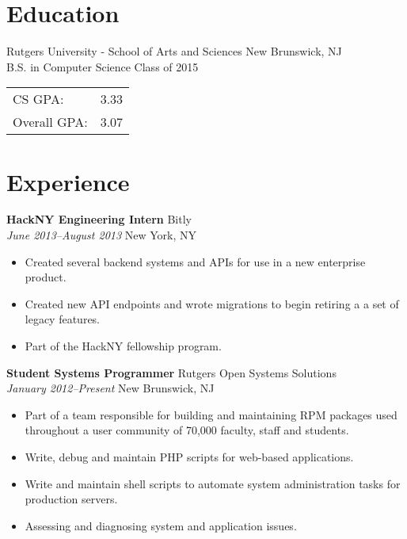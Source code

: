 \documentclass[centered,overlapped]{res}
\begin{document}

\address{153 Riveredge Road \\ Tinton Falls, NJ 07724}
\address{josh@jmatthews.us \\ github.com/jmatth}

\begin{resume}


\section{Education}

Rutgers University - School of Arts and Sciences \hfill New Brunswick, NJ\\
B.S. in Computer Science \hfill Class of 2015 \\
\begin{tabular}{l l}
	CS GPA: & 3.33 \\
	Overall GPA: & 3.07 \\
\end{tabular}

\section{Experience}

{\bf HackNY Engineering Intern} \hfill Bitly\\
\textit{June 2013--August 2013} \hfill New York, NY
\begin{itemize} \itemsep -2pt %
	\item Created several backend systems and APIs for use in a new enterprise
        product.
    \item Created new API endpoints and wrote migrations to begin retiring a
        a set of legacy features.
    \item Part of the HackNY fellowship program.
\end{itemize}

{\bf Student Systems Programmer} \hfill Rutgers Open Systems Solutions\\
\textit{January 2012--Present} \hfill New Brunswick, NJ
\begin{itemize} \itemsep -2pt %
	\item Part of a team responsible for building and maintaining RPM packages used throughout a user community of 70,000 faculty, staff and students.
	\item Write, debug and maintain PHP scripts for web-based applications.
	\item Write and maintain shell scripts to automate system administration tasks for production servers.
	\item Assessing and diagnosing system and application issues.
\end{itemize}


\end{resume}
\end{document}
